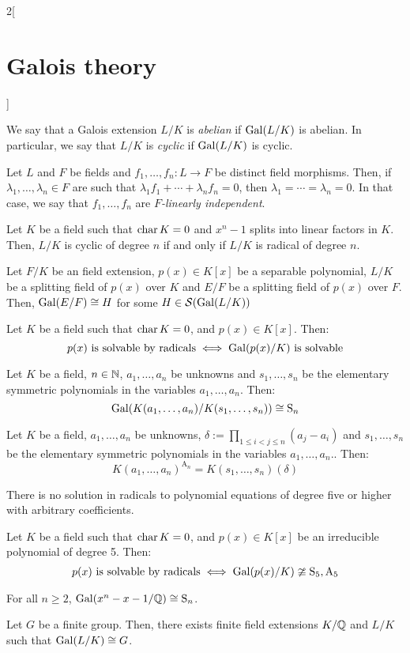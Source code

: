 \documentclass[../../../main.tex]{subfiles}
\begin{document}
\begin{multicols}{2}[\section{Galois theory}]
  \begin{definition}
    We say that a Galois extension $L/K$ is \emph{abelian} if $\operatorname{Gal}(L/K)$ is abelian. In particular, we say that $L/K$ is \emph{cyclic} if $\operatorname{Gal}(L/K)$ is cyclic.
  \end{definition}
  \begin{lemma}
    Let $L$ and $F$ be fields and $f_1,\ldots,f_n:L\rightarrow F$ be distinct field morphisms. Then, if $\lambda_1,\ldots,\lambda_n\in F$ are such that $\lambda_1f_1+\cdots+\lambda_nf_n=0$, then $\lambda_1=\cdots=\lambda_n=0$. In that case, we say that $f_1,\ldots,f_n$ are \emph{$F$-linearly independent}.
  \end{lemma}
  \begin{theorem}
    Let $K$ be a field such that $\operatorname{char} K=0$ and $x^n-1$ splits into linear factors in $K$. Then, $L/K$ is cyclic of degree $n$ if and only if $L/K$ is radical of degree $n$.
  \end{theorem}
  \begin{lemma}
    Let $F/K$ be an field extension, $p(x)\in K[x]$ be a separable polynomial, $L/K$ be a splitting field of $p(x)$ over $K$ and $E/F$ be a splitting field of $p(x)$ over $F$. Then, $\operatorname{Gal}(E/F)\cong H$ for some $H\in\mathcal{S}(\operatorname{Gal}(L/K))$
  \end{lemma}
  \begin{theorem}
    Let $K$ be a field such that $\operatorname{char} K=0$, and $p(x)\in K[x]$. Then: $$p(x)\text{ is solvable by radicals}\iff\operatorname{Gal}(p(x)/K)\text{ is solvable}$$
  \end{theorem}
  \begin{lemma}
    Let $K$ be a field, $n\in\mathbb{N}$, $a_1,\ldots,a_n$ be unknowns and $s_1,\ldots,s_n$ be the elementary symmetric polynomials in the variables $a_1,\ldots,a_n$. Then: $$\operatorname{Gal}(K(a_1,\ldots,a_n)/K(s_1,\ldots,s_n))\cong \text{S}_n$$
  \end{lemma}
  \begin{corollary}
    Let $K$ be a field, $a_1,\ldots,a_n$ be unknowns, $\delta:=\prod_{1\leq i<j\leq n}(a_j-a_i)$ and $s_1,\ldots,s_n$ be the elementary symmetric polynomials in the variables $a_1,\ldots,a_n$.. Then: $${K(a_1,\ldots,a_n)}^{\text{A}_n}=K(s_1,\ldots,s_n)(\delta)$$
  \end{corollary}
  \begin{theorem}
    There is no solution in radicals to polynomial equations of degree five or higher with arbitrary coefficients.
  \end{theorem}
  \begin{prop}
    Let $K$ be a field such that $\operatorname{char} K=0$, and $p(x)\in K[x]$ be an irreducible polynomial of degree 5. Then:
    $$p(x)\text{ is solvable by radicals}\iff\operatorname{Gal}(p(x)/K)\ncong\text{S}_5,\text{A}_5$$
  \end{prop}
  \begin{theorem}
    For all $n\geq 2$, $\operatorname{Gal}(x^n-x-1/\mathbb{Q})\cong \text{S}_n$.
  \end{theorem}
  \begin{corollary}
    Let $G$ be a finite group. Then, there exists finite field extensions $K/\mathbb{Q}$ and $L/K$ such that $\operatorname{Gal}(L/K)\cong G$.
  \end{corollary}

\end{multicols}
\end{document}
